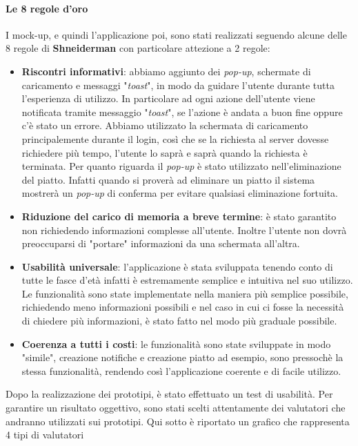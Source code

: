\paragraph{Le 8 regole d'oro}
I mock-up, e quindi l'applicazione poi, sono stati realizzati seguendo alcune delle 8 regole di \textbf{Shneiderman} con particolare attezione a 2 regole:
\begin{itemize}
  \item \textbf{Riscontri informativi}: abbiamo aggiunto dei \textit{pop-up}, schermate di caricamento e messaggi "\textit{toast}", in modo da guidare l'utente durante tutta l'esperienza di utilizzo.
        In particolare ad ogni azione dell'utente viene notificata tramite messaggio "\textit{toast}", se l'azione è andata a buon fine oppure c'è stato un errore. Abbiamo utilizzato la schermata di caricamento principalemente durante il login, così che se la richiesta al server dovesse richiedere più tempo, l'utente lo saprà e saprà quando la richiesta è terminata.
        Per quanto riguarda il \textit{pop-up} è stato utilizzato nell'eliminazione del piatto. Infatti quando si proverà ad eliminare un piatto il sistema mostrerà un \textit{pop-up} di conferma per evitare qualsiasi eliminazione fortuita.
  \item \textbf{Riduzione del carico di memoria a breve termine}: è stato garantito non richiedendo informazioni complesse all'utente. Inoltre l'utente non dovrà preoccuparsi di "portare" informazioni da una schermata all'altra.
  \item \textbf{Usabilità universale}: l'applicazione è stata sviluppata tenendo conto di tutte le fasce d'età infatti è estremamente semplice e intuitiva nel suo utilizzo. Le funzionalità sono state implementate nella maniera più semplice possibile, richiedendo meno informazioni possibili e nel caso in cui ci fosse la necessità di chiedere più informazioni, è stato fatto nel modo più graduale possibile.
  \item \textbf{Coerenza a tutti i costi}: le funzionalità sono state sviluppate in modo "simile", creazione notifiche e creazione piatto ad esempio, sono pressochè la stessa funzionalità, rendendo così l'applicazione coerente e di facile utilizzo.
\end{itemize}
\newpage
Dopo la realizzazione dei prototipi, è stato effettuato un test di usabilità. Per garantire un risultato oggettivo, sono stati scelti attentamente dei valutatori che andranno utilizzati sui prototipi.
Qui sotto è riportato un grafico che rappresenta 4 tipi di valutatori
